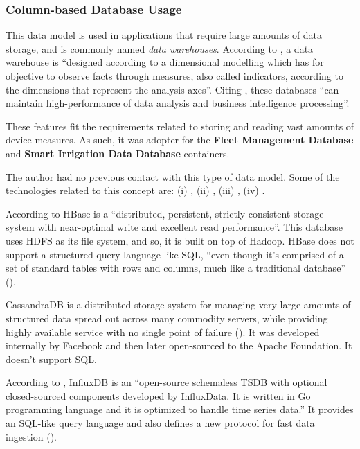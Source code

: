 \subsubsection{Column-based Database Usage}
\label{subsubsec:implementation:decisions:database:time}

This data model is used in applications that require large amounts of data storage, and is commonly named \textit{data warehouses}. According to \cite{dehdouh2015using}, a data warehouse  is ``designed according to a dimensional modelling which has for objective to observe facts through measures, also called indicators, according to the dimensions that represent the analysis axes''. Citing \cite{han2011survey}, these databases ``can maintain high-performance of data analysis and business intelligence processing''.

These features fit the requirements related to storing and reading vast amounts of device measures. As such, it was adopter for the \textbf{Fleet Management Database} and \textbf{Smart Irrigation Data Database} containers.

The author had no previous contact with this type of data model. Some of the technologies related to this concept are: (i) , (ii) , (iii) , (iv) .

According to \cite{george2011hbase} HBase is a ``distributed, persistent, strictly consistent storage system with near-optimal write and excellent read performance''. This database uses \gls{HDFS} as its file system, and so, it is built on top of Hadoop.
HBase does not support a structured query language like \gls{SQL}, ``even though it's comprised of a set of standard tables with rows and columns, much like a traditional database'' (\cite{ibm-hbase}).

CassandraDB is a distributed storage system for managing very large amounts of structured data spread out across many commodity servers, while providing highly available service with no single point of failure (\cite{lakshman2010cassandra}).
It was developed internally by Facebook and then later open-sourced to the Apache Foundation. It doesn't support \gls{SQL}.

According to \cite{naqvi2017time}, InfluxDB is an ``open-source schemaless \gls{TSDB} with optional closed-sourced components developed by InfluxData. It is written in Go programming language and it is optimized to handle time series data.'' It provides an SQL-like query language and also defines a new protocol for fast data ingestion (\cite{ilp}).

